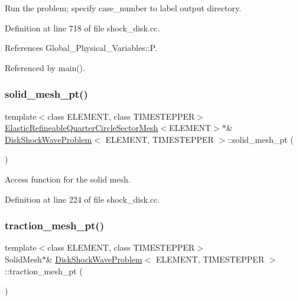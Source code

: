 Run the problem; specify case\+\_\+number to label output directory. 



Definition at line 718 of file shock\+\_\+disk.\+cc.



References Global\+\_\+\+Physical\+\_\+\+Variables\+::P.



Referenced by main().

\mbox{\label{classDiskShockWaveProblem_a558dc0ca72e4e1974c98cdf5203d015b}} 
\subsubsection{\texorpdfstring{solid\+\_\+mesh\+\_\+pt()}{solid\_mesh\_pt()}}
{\footnotesize\ttfamily template$<$class E\+L\+E\+M\+E\+NT, class T\+I\+M\+E\+S\+T\+E\+P\+P\+ER$>$ \\
\hyperlink{classElasticRefineableQuarterCircleSectorMesh}{Elastic\+Refineable\+Quarter\+Circle\+Sector\+Mesh}$<$E\+L\+E\+M\+E\+NT$>$$\ast$\& \hyperlink{classDiskShockWaveProblem}{Disk\+Shock\+Wave\+Problem}$<$ E\+L\+E\+M\+E\+NT, T\+I\+M\+E\+S\+T\+E\+P\+P\+ER $>$\+::solid\+\_\+mesh\+\_\+pt (\begin{DoxyParamCaption}{ }\end{DoxyParamCaption})\hspace{0.3cm}{\ttfamily [inline]}}



Access function for the solid mesh. 



Definition at line 224 of file shock\+\_\+disk.\+cc.

\mbox{\label{classDiskShockWaveProblem_aade14ed9df7e698c3e90abea96090ab5}} 
\subsubsection{\texorpdfstring{traction\+\_\+mesh\+\_\+pt()}{traction\_mesh\_pt()}}
{\footnotesize\ttfamily template$<$class E\+L\+E\+M\+E\+NT, class T\+I\+M\+E\+S\+T\+E\+P\+P\+ER$>$ \\
Solid\+Mesh$\ast$\& \hyperlink{classDiskShockWaveProblem}{Disk\+Shock\+Wave\+Problem}$<$ E\+L\+E\+M\+E\+NT, T\+I\+M\+E\+S\+T\+E\+P\+P\+ER $>$\+::traction\+\_\+mesh\+\_\+pt (\begin{DoxyParamCaption}{ }\end{DoxyParamCaption})\hspace{0.3cm}{\ttfamily [inline]}}



